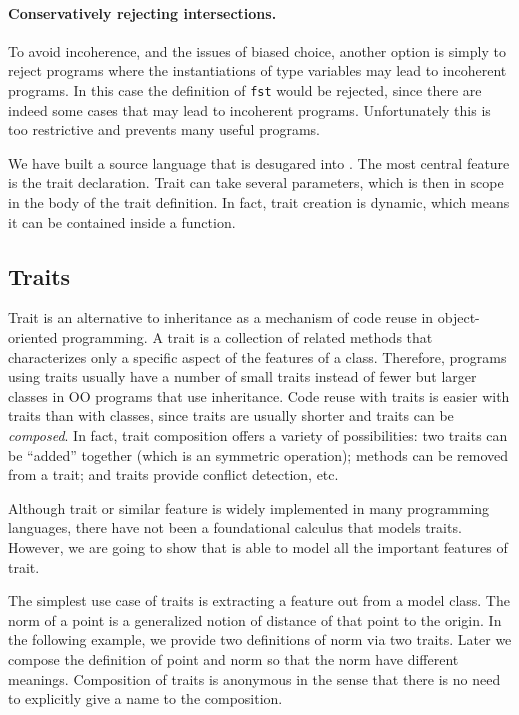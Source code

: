 \paragraph{Conservatively rejecting intersections.}
To avoid incoherence, and the issues of biased choice, another option
is simply to reject programs where the
instantiations of type variables may lead to incoherent programs.
In this case the definition of \lstinline$fst$ would be rejected, since there
are indeed some cases that may lead to incoherent programs.
Unfortunately this is too restrictive and prevents many useful
programs.

We have built a source language that is desugared into \name. The most
central feature is the trait declaration. Trait can take several parameters,
which is then in scope in the body of the trait definition. In fact, trait
creation is dynamic, which means it can be contained inside a function.

\subsection{Traits}

Trait is an alternative to inheritance as a mechanism of code reuse in
object-oriented programming. A trait is a collection of related methods that
characterizes only a specific aspect of the features of a class. Therefore,
programs using traits usually have a number of small traits instead of fewer but
larger classes in OO programs that use inheritance. Code reuse with traits is
easier with traits than with classes, since traits are usually shorter and
traits can be \emph{composed}. In fact, trait composition offers a variety of
possibilities: two traits can be ``added'' together (which is an symmetric
operation); methods can be removed from a trait; and traits provide conflict
detection, etc.

Although trait or similar feature is widely implemented in many programming
languages, there have not been a foundational calculus that models traits.
However, we are going to show that \name is able to model all the important
features of trait.

The simplest use case of traits is extracting a feature out from a model class.
The norm of a point is a generalized notion of distance of that point to the
origin. In the following example, we provide two definitions of norm via two
traits. Later we compose the definition of point and norm so that the norm have
different meanings. Composition of traits is anonymous in the sense that there
is no need to explicitly give a name to the composition.

